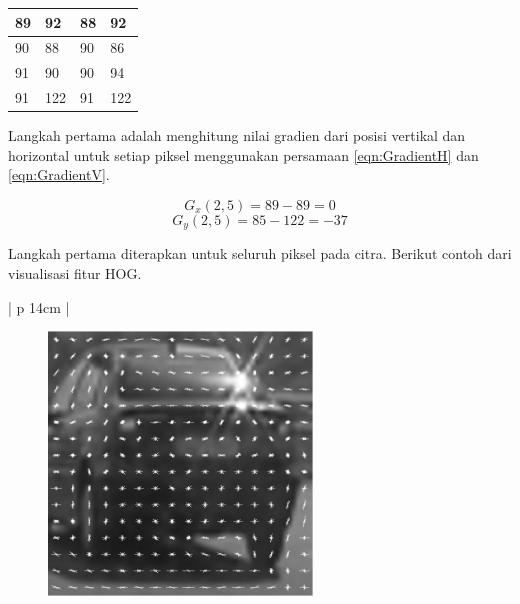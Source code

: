 \begin{table}[H]
	\centering
	\begin{small}
		\begin{tabular}{|p{2cm}|p{2cm}|p{2cm}|p{2cm}|}
			\hline
			89 & 92 & 88 & 92 \\
			\hline
			90 & 88 & 90 & 86 \\
			\hline
			91 & 90 & 90 & 94 \\
			\hline
			91 & 122 & 91 & 122 \\
			\hline
		\end{tabular}
	\end{small}
	\label{fig:MatriksCitraHasilPreprocessing}
\end{table}

Langkah pertama adalah menghitung nilai gradien dari posisi vertikal dan horizontal untuk setiap piksel menggunakan persamaan \eqref{eqn:GradientH} dan \eqref{eqn:GradientV}.

\begin{equation*}
	G_{x}(2,5) = 89 - 89 = 0
\end{equation*}
\begin{equation*}
	G_{y}(2,5) = 85 - 122 = -37
\end{equation*}

Langkah pertama diterapkan untuk seluruh piksel pada citra. Berikut contoh dari visualisasi fitur HOG.

\begin{table}[H]
	\small
	\begin{adjustbox}{width=1\textwidth}
		\begin{tabular}{| p {14cm} |}
			\hline
			\begin{figure}[H]
				\centering
				\includegraphics[width=7cm]{images/car_hog_gray4x4}
			\end{figure} \\
			\hline
		\end{tabular}
	\end{adjustbox}
	\label{fig:FiturHOG}
\end{table}

